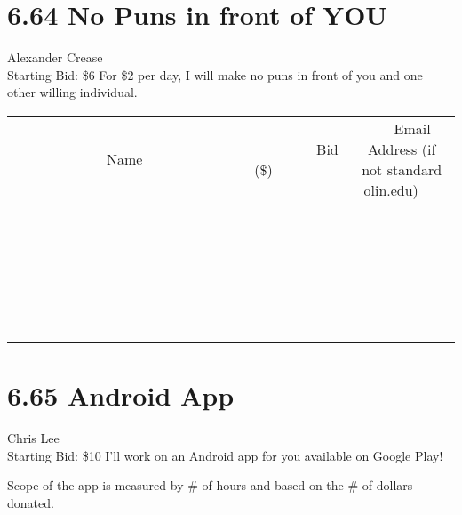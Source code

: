 \documentclass[11pt]{article}
\begin{document}
\section*{6.64 No Puns in front of YOU}
Alexander Crease
\\
Starting Bid: \$6
\newline
For \$2 per day, I will make no puns in front of you and one other willing individual.
\\[6ex]
\begin{tabular}{c c c}
~~~~~~~~~~~~~Name~~~~~~~~~~~~~ & ~~~~~~~~~Bid (\$)~~~~~~~~~  & ~~~Email Address (if not standard olin.edu)~~~\\
 & & \\
\hline
 & & \\
\hline
 & & \\
\hline
 & & \\
\hline
 & & \\
\hline
 & & \\
\hline
 & & \\
\hline
 & & \\
\hline
 & & \\
\hline
 & & \\
\hline
 & & \\
\hline
 & & \\
\hline
 & & \\
\hline
 & & \\
\hline
 & & \\
\hline
 & & \\
\hline
 & & \\
\hline
 & & \\
\hline
 & & \\
\hline
 & & \\
\hline
 & & \\
\hline
 & & \\
\hline
 & & \\
\hline
 & & \\
\hline
 & & \\
\hline
 & & \\
\hline
\end{tabular}
\newpage
\section*{6.65 Android App}
Chris Lee
\\
Starting Bid: \$10
\newline
I'll work on an Android app for you available on Google Play!

Scope of the app is measured by \# of hours and based on the \# of dollars donated. 
\end{document}
